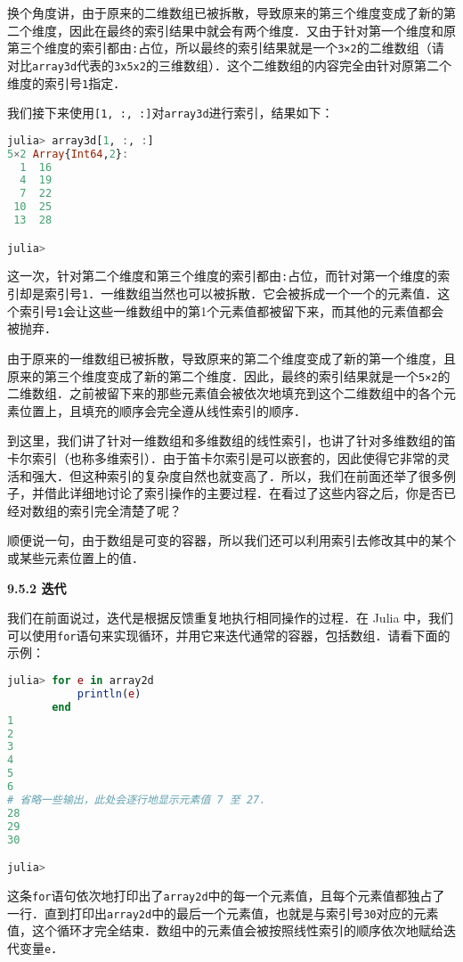 换个角度讲，由于原来的二维数组已被拆散，导致原来的第三个维度变成了新的第二个维度，因此在最终的索引结果中就会有两个维度．又由于针对第一个维度和原第三个维度的索引都由\verb|:|占位，所以最终的索引结果就是一个\verb|3×2|的二维数组（请对比\verb|array3d|代表的\verb|3x5x2|的三维数组）．这个二维数组的内容完全由针对原第二个维度的索引号\verb|1|指定．

我们接下来使用\verb|[1, :, :]|对\verb|array3d|进行索引，结果如下：

\begin{lstlisting}[language=julia]
julia> array3d[1, :, :]
5×2 Array{Int64,2}:
  1  16
  4  19
  7  22
 10  25
 13  28

julia> 
\end{lstlisting}

这一次，针对第二个维度和第三个维度的索引都由\verb|:|占位，而针对第一个维度的索引却是索引号\verb|1|．一维数组当然也可以被拆散．它会被拆成一个一个的元素值．这个索引号\verb|1|会让这些一维数组中的第1个元素值都被留下来，而其他的元素值都会被抛弃．

由于原来的一维数组已被拆散，导致原来的第二个维度变成了新的第一个维度，且原来的第三个维度变成了新的第二个维度．因此，最终的索引结果就是一个\verb|5×2|的二维数组．之前被留下来的那些元素值会被依次地填充到这个二维数组中的各个元素位置上，且填充的顺序会完全遵从线性索引的顺序．

到这里，我们讲了针对一维数组和多维数组的线性索引，也讲了针对多维数组的笛卡尔索引（也称多维索引）．由于笛卡尔索引是可以嵌套的，因此使得它非常的灵活和强大．但这种索引的复杂度自然也就变高了．所以，我们在前面还举了很多例子，并借此详细地讨论了索引操作的主要过程．在看过了这些内容之后，你是否已经对数组的索引完全清楚了呢？

顺便说一句，由于数组是可变的容器，所以我们还可以利用索引去修改其中的某个或某些元素位置上的值．

\textbf{9.5.2 迭代}

我们在前面说过，迭代是根据反馈重复地执行相同操作的过程．在 Julia 中，我们可以使用\verb|for|语句来实现循环，并用它来迭代通常的容器，包括数组．请看下面的示例：

\begin{lstlisting}[language=julia]
julia> for e in array2d
           println(e)
       end
1
2
3
4
5
6
# 省略一些输出，此处会逐行地显示元素值 7 至 27．
28
29
30

julia> 
\end{lstlisting}

这条\verb|for|语句依次地打印出了\verb|array2d|中的每一个元素值，且每个元素值都独占了一行．直到打印出\verb|array2d|中的最后一个元素值，也就是与索引号\verb|30|对应的元素值，这个循环才完全结束．数组中的元素值会被按照线性索引的顺序依次地赋给迭代变量\verb|e|．

